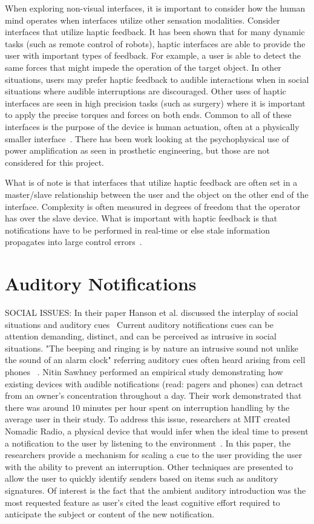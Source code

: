 When exploring non-visual interfaces, it is important to consider how the human
mind operates when interfaces utilize other sensation modalities. Consider
interfaces that utilize haptic feedback.  It has been shown that for many
dynamic tasks (such as remote control of robots), haptic interfaces are able to
provide the user with important types of feedback.  For example, a user is able
to detect the same forces that might impede the operation of the target object.
In other situations, users may prefer haptic feedback to audible interactions
when in social situations where audible interruptions are discouraged.  Other
uses of haptic interfaces are seen in high precision tasks (such as surgery)
where it is important to apply the precise torques and forces on both ends.
Common to all of these interfaces is the purpose of the device is human
actuation, often at a physically smaller interface~\cite{ellis1996design}.
There has been work looking at the psychophysical use of power amplification
as seen in prosthetic engineering, but those are not considered for this
project.

What is of note is that interfaces that utilize haptic feedback are often set in
a master/slave relationship between the user and the object on the other end of
the interface. Complexity is often measured in degrees of freedom that the
operator has over the slave device.  What is important with haptic feedback is
that notifications have to be performed in real-time or else stale information
propagates into large control errors~\cite{ellis1996design}.

\section{                  Auditory Notifications                            }

SOCIAL ISSUES: In their paper Hanson et al. discussed the interplay of social
situations and auditory cues~\cite{hansson2001subtle} Current auditory
notifications cues can be attention demanding, distinct, and can be perceived as
intrusive in social situations. "The beeping and ringing is by nature an
intrusive sound not unlike the sound of an alarm clock" referring auditory cues
often heard arising from cell phones  ~\cite{hansson2001subtle}.  Nitin Sawhney
performed an empirical study demonstrating how existing devices with audible
notifications (read: pagers and phones) can detract from an owner's
concentration throughout a day.  Their work demonstrated that there was around
10 minutes per hour spent on  interruption handling by the average user in their study.
To address this issue, researchers at MIT created Nomadic Radio, a physical
device that would infer when the ideal time to present a notification to the
user by listening to the environment~\cite{sawhney1999nomadic}. In this paper,
the researchers provide a mechanism for scaling a cue to the user providing
the user with the ability to prevent an interruption. Other techniques are
presented to allow the user to quickly identify senders based on items such as
auditory signatures.  Of interest is the fact that the ambient auditory
introduction was the most requested feature as user's cited the least cognitive
effort required to anticipate the subject or content of the new notification.
